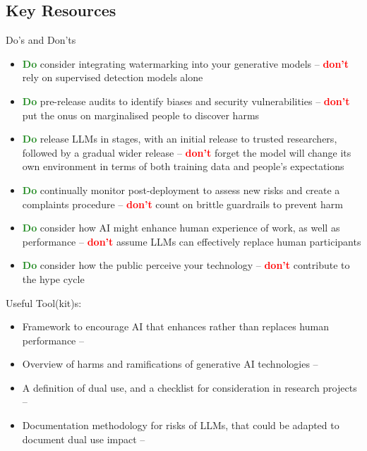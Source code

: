 \subsection{Key Resources}
Do's and Don'ts
\begin{itemize}
    \item \textcolor{ForestGreen}{\textbf{Do}} consider integrating watermarking into your generative models --  \textcolor{red}{\textbf{don't}} rely on supervised detection models alone
    \item \textcolor{ForestGreen}{\textbf{Do}} pre-release audits to identify biases and security vulnerabilities \cite{madnani_building_2017} -- \textcolor{red}{\textbf{don't}} put the onus on marginalised people to discover harms
    
    \item \textcolor{ForestGreen}{\textbf{Do}} release LLMs in stages, with an initial release to trusted researchers, followed by a gradual wider release \cite{solaiman_release_2019} -- \textcolor{red}{\textbf{don't}} forget the model will change its own environment in terms of both training data and people's expectations
    \item \textcolor{ForestGreen}{\textbf{Do}} continually monitor post-deployment to assess new risks and create a complaints procedure \cite{anderljung2023frontier} -- \textcolor{red}{\textbf{don't}} count on brittle guardrails to prevent harm
    \item \textcolor{ForestGreen}{\textbf{Do}} consider how AI might enhance human experience of work, as well as performance -- \textcolor{red}{\textbf{don't}} assume LLMs can effectively replace human participants 
    \item \textcolor{ForestGreen}{\textbf{Do}} consider how the public perceive your technology -- \textcolor{red}{\textbf{don't}} contribute to the hype cycle
     
\end{itemize}



\noindent Useful Tool(kit)s: 
\begin{itemize}
    \item Framework to encourage AI that enhances rather than replaces human performance -- \citet{shneiderman_human-centered_2020}
    \item Overview of harms and ramifications of generative AI technologies -- \citet{Solaiman_Evaluating_2024}
    \item A definition of dual use, and a checklist for consideration in research projects -- \citet{kaffee_thorny_2023}
    \item Documentation methodology for risks of LLMs, that could be adapted to document dual use impact -- \citet{derczynski_assessing_2023}
\end{itemize}
